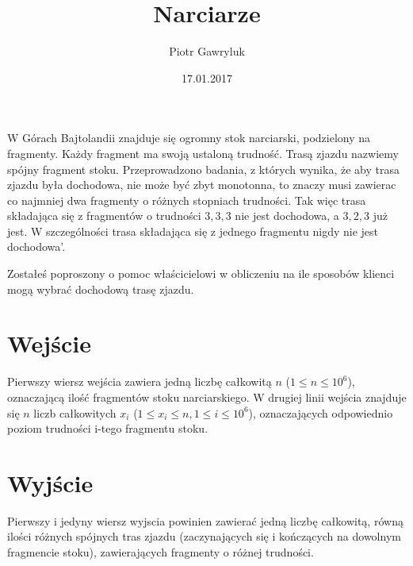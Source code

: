 \documentclass[zad,zawodnik,utf8]{sinol}
\title{Narciarze}
\author{Piotr Gawryluk} %
\date{17.01.2017}
\begin{document}
  \begin{tasktext}%

W Górach Bajtolandii znajduje się ogromny stok narciarski, podzielony na fragmenty. Każdy fragment ma swoją ustaloną trudność.
Trasą zjazdu nazwiemy spójny fragment stoku. Przeprowadzono badania, z których wynika, że aby trasa zjazdu była dochodowa, nie może być zbyt monotonna,
to znaczy musi zawierac co najmniej dwa fragmenty o różnych stopniach trudności.
Tak więc trasa składająca się z fragmentów o trudności $3, 3, 3$ nie jest dochodowa, a $3, 2, 3$ już jest.
W szczególności trasa składająca się z jednego fragmentu nigdy nie jest dochodowa'.

Zostałeś poproszony o pomoc właścicielowi w obliczeniu na ile sposobów klienci mogą wybrać dochodową trasę zjazdu.

  \section{Wejście}

Pierwszy wiersz wejścia zawiera jedną liczbę całkowitą $n$ ($1 \leq n \leq 10^{6}$), 
oznaczającą ilość fragmentów stoku narciarskiego. W drugiej linii wejścia znajduje się $n$ liczb całkowitych 
$x_{i}$ ($ 1 \leq x_{i} \leq n, 1 \leq i \leq 10^{6} $), oznaczających odpowiednio poziom trudności i-tego 
fragmentu stoku.

  \section{Wyjście}

Pierwszy i jedyny wiersz wyjscia powinien zawierać jedną liczbę całkowitą, równą ilości różnych spójnych 
tras zjazdu (zaczynających się i kończących na dowolnym fragmencie stoku), zawierających fragmenty o 
różnej trudności.

     \makecompactexample

  \end{tasktext}
\end{document}

